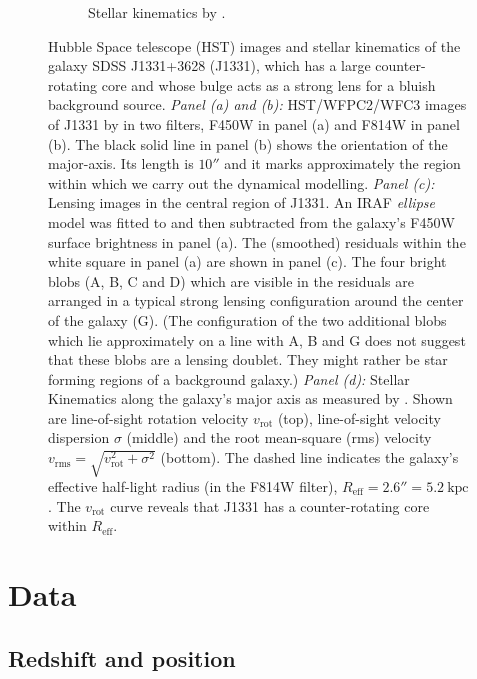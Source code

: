 \documentclass[useAMS,usenatbib]{mnras}
\begin{document}
\begin{figure}
\begin{subfigure}{.5\textwidth}
  \caption{Stellar kinematics by \citet{SWELLSV}.}
  \label{fig:kinematics}
\end{subfigure}
\caption{Hubble Space telescope (HST) images and stellar kinematics of the galaxy SDSS J1331+3628 (J1331), which has a large counter-rotating core and whose bulge acts as a strong lens for a bluish background source. \emph{Panel (a) and (b):} HST/WFPC2/WFC3 images of J1331 by \citet{SWELLSI} in two filters, F450W in panel (a) and F814W in panel (b). The black solid line in panel (b) shows the orientation of the major-axis. Its length is $10''$ and it marks approximately the region within which we carry out the dynamical modelling. \emph{Panel (c):} Lensing images in the central region of J1331.  An IRAF \emph{ellipse} model was fitted to and then subtracted from the galaxy's F450W surface brightness in panel (a). The (smoothed) residuals within the white square in panel (a) are shown in panel (c). The four bright blobs (A, B, C and D) which are visible in the residuals are arranged in a typical strong lensing configuration around the center of the galaxy (G). (The configuration of the two additional blobs which lie approximately on a line with A, B and G does not suggest that these blobs are a lensing doublet. They might rather be star forming regions of a background galaxy.) \emph{Panel (d):} Stellar Kinematics along the galaxy's major axis as measured by \citet{SWELLSV}. Shown are line-of-sight rotation velocity $v_\text{rot}$ (top), line-of-sight velocity dispersion $\sigma$ (middle) and the root mean-square (rms) velocity $v_\text{rms} = \sqrt{v_\text{rot}^2 + \sigma^2}$ (bottom). The dashed line indicates the galaxy's effective half-light radius (in the F814W filter), $R_\text{eff} = 2.6'' = 5.2~\text{kpc}$. The $v_\text{rot}$ curve reveals that J1331 has a counter-rotating core within $R_\text{eff}$.}
\label{fig:specialJ1331}
\end{figure}

\section{Data} \label{sec:data}

\subsection{Redshift and position}
\end{document}
